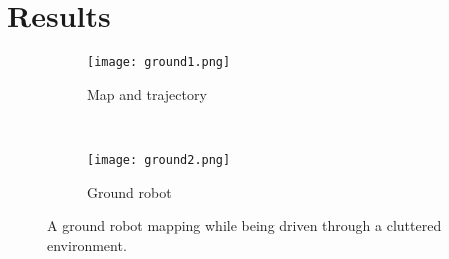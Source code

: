 \section{Results}
\label{sec:results}

\begin{figure*}
  \centering
  \begin{subfigure}{0.47\textwidth}
    \centering
    \texttt{[image: ground1.png]}
    \caption{Map and trajectory\label{fig:ground_bot1}}
  \end{subfigure}
  ~
  \begin{subfigure}{0.47\textwidth}
    \centering
    \texttt{[image: ground2.png]}
    \caption{Ground robot\label{fig:ground_bot2}}
  \end{subfigure}
  \caption{A ground robot mapping while being driven through a cluttered environment.\label{fig:ground_bot}}
\end{figure*}


